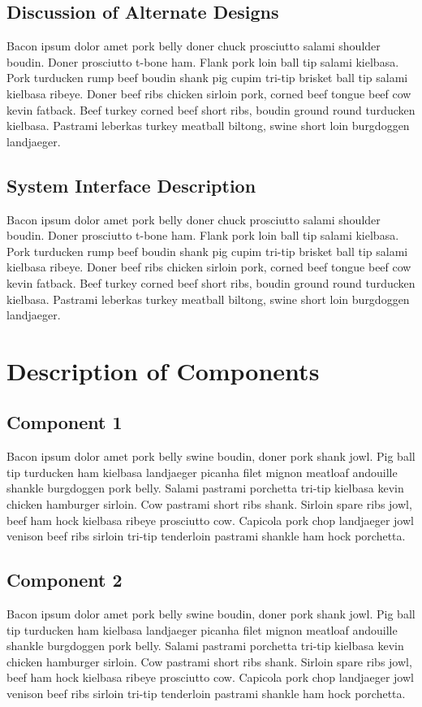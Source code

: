 \documentclass[12pt]{memoir}
\begin{document}
	\subsection{Discussion of Alternate Designs}
Bacon ipsum dolor amet pork belly doner chuck prosciutto salami shoulder boudin. Doner prosciutto t-bone ham. Flank pork loin ball tip salami kielbasa. Pork turducken rump beef boudin shank pig cupim tri-tip brisket ball tip salami kielbasa ribeye. Doner beef ribs chicken sirloin pork, corned beef tongue beef cow kevin fatback. Beef turkey corned beef short ribs, boudin ground round turducken kielbasa. Pastrami leberkas turkey meatball biltong, swine short loin burgdoggen landjaeger.

	\subsection{System Interface Description}
Bacon ipsum dolor amet pork belly doner chuck prosciutto salami shoulder boudin. Doner prosciutto t-bone ham. Flank pork loin ball tip salami kielbasa. Pork turducken rump beef boudin shank pig cupim tri-tip brisket ball tip salami kielbasa ribeye. Doner beef ribs chicken sirloin pork, corned beef tongue beef cow kevin fatback. Beef turkey corned beef short ribs, boudin ground round turducken kielbasa. Pastrami leberkas turkey meatball biltong, swine short loin burgdoggen landjaeger.

	\newpage
	\section{Description of Components}
	\subsection{Component 1}
Bacon ipsum dolor amet pork belly swine boudin, doner pork shank jowl. Pig ball tip turducken ham kielbasa landjaeger picanha filet mignon meatloaf andouille shankle burgdoggen pork belly. Salami pastrami porchetta tri-tip kielbasa kevin chicken hamburger sirloin. Cow pastrami short ribs shank. Sirloin spare ribs jowl, beef ham hock kielbasa ribeye prosciutto cow. Capicola pork chop landjaeger jowl venison beef ribs sirloin tri-tip tenderloin pastrami shankle ham hock porchetta.

	\subsection{Component 2}
Bacon ipsum dolor amet pork belly swine boudin, doner pork shank jowl. Pig ball tip turducken ham kielbasa landjaeger picanha filet mignon meatloaf andouille shankle burgdoggen pork belly. Salami pastrami porchetta tri-tip kielbasa kevin chicken hamburger sirloin. Cow pastrami short ribs shank. Sirloin spare ribs jowl, beef ham hock kielbasa ribeye prosciutto cow. Capicola pork chop landjaeger jowl venison beef ribs sirloin tri-tip tenderloin pastrami shankle ham hock porchetta.
\end{document}
